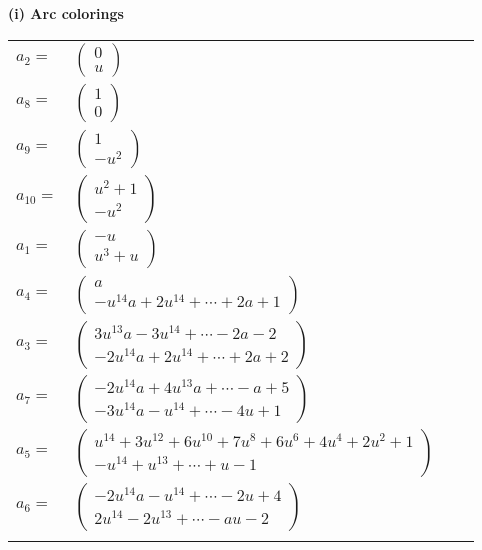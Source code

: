 \documentclass[1p]{elsarticle_modified}
\theoremstyle{definition}
\begin{document}
\flushleft \textbf{(i) Arc colorings}\\
\begin{tabular}{m{7pt} m{180pt} m{7pt} m{180pt} }
\flushright $a_{2}=$&$\begin{pmatrix}0\\u\end{pmatrix}$ \\
\flushright $a_{8}=$&$\begin{pmatrix}1\\0\end{pmatrix}$ \\
\flushright $a_{9}=$&$\begin{pmatrix}1\\- u^2\end{pmatrix}$ \\
\flushright $a_{10}=$&$\begin{pmatrix}u^2+1\\- u^2\end{pmatrix}$ \\
\flushright $a_{1}=$&$\begin{pmatrix}- u\\u^3+u\end{pmatrix}$ \\
\flushright $a_{4}=$&$\begin{pmatrix}a\\- u^{14} a+2 u^{14}+\cdots+2 a+1\end{pmatrix}$ \\
\flushright $a_{3}=$&$\begin{pmatrix}3 u^{13} a-3 u^{14}+\cdots-2 a-2\\-2 u^{14} a+2 u^{14}+\cdots+2 a+2\end{pmatrix}$ \\
\flushright $a_{7}=$&$\begin{pmatrix}-2 u^{14} a+4 u^{13} a+\cdots- a+5\\-3 u^{14} a- u^{14}+\cdots-4 u+1\end{pmatrix}$ \\
\flushright $a_{5}=$&$\begin{pmatrix}u^{14}+3 u^{12}+6 u^{10}+7 u^8+6 u^6+4 u^4+2 u^2+1\\- u^{14}+u^{13}+\cdots+u-1\end{pmatrix}$ \\
\flushright $a_{6}=$&$\begin{pmatrix}-2 u^{14} a- u^{14}+\cdots-2 u+4\\2 u^{14}-2 u^{13}+\cdots- a u-2\end{pmatrix}$\\&\end{tabular}
\end{document}
